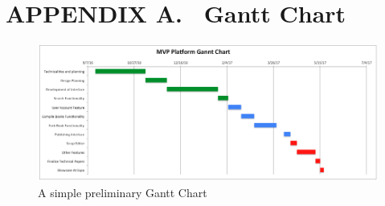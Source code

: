 \documentclass[letterpaper, 10pt, draftclsnofoot, compsoc, onecolumn]{IEEEtran}
\begin{document}
{{


\clearpage
\section[APPENDIX A. \ Gantt Chart]{\rmfamily\bfseries\color{black}
APPENDIX A. \ Gantt Chart}

\bigskip


\begin{figure}[ht!]
\centering
\includegraphics[width=160mm]{gantt_chart.png}
\caption{A simple preliminary Gantt Chart}
\end{figure}

}}
\end{document}
